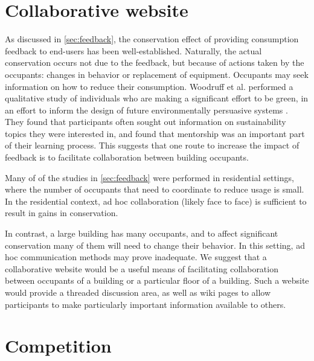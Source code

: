 \documentclass[11pt]{article}
\begin{document}
\section{Collaborative website}

As discussed in \autoref{sec:feedback}, the conservation effect of providing consumption feedback to end-users has been well-established. Naturally, the actual conservation occurs not due to the feedback, but because of actions taken by the occupants: changes in behavior or replacement of equipment. Occupants may seek information on how to reduce their consumption. Woodruff et al. performed a qualitative study of individuals who are making a significant effort to be green, in an effort to inform the design of future environmentally persuasive 
systems \cite{Woodruff2008-bright-green}. They found that participants often sought out information on sustainability topics they were interested in, and found that mentorship was an important part of their learning process. This suggests that one route to increase the impact of feedback is to facilitate collaboration between building occupants.

Many of of the studies in \autoref{sec:feedback} were performed in residential settings, where the number of occupants that need to coordinate to reduce usage is small. In the residential context, ad hoc collaboration (likely face to face) is sufficient to result in gains in conservation.

In contrast, a large building has many occupants, and to affect significant conservation many of them will need to change their behavior. In this setting, ad hoc communication methods may prove inadequate. We suggest that a collaborative website would be a useful means of facilitating collaboration between occupants of a building or a particular floor of a building. Such a website would provide a threaded discussion area, as well as wiki pages to allow participants to make particularly important information available to others.

\section{Competition}
\end{document}

